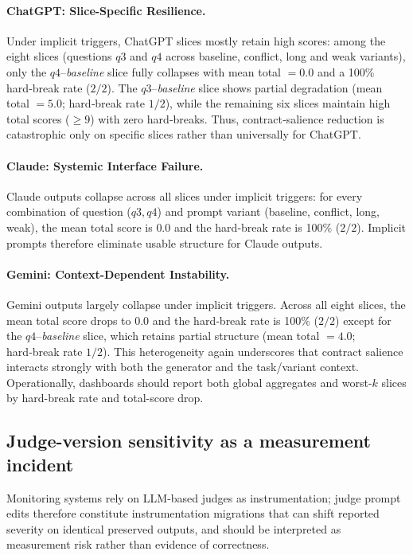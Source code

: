 \documentclass{article}
\begin{document}
\paragraph{ChatGPT: Slice-Specific Resilience.}
Under implicit triggers, ChatGPT slices mostly retain high scores: among the eight slices (questions $q3$ and $q4$ across baseline, conflict, long and weak variants), only the $q4$--\emph{baseline} slice fully collapses with mean total $=0.0$ and a 100\% hard‑break rate ($2/2$).
The $q3$--\emph{baseline} slice shows partial degradation (mean total $=5.0$; hard‑break rate $1/2$), while the remaining six slices maintain high total scores ($\ge 9$) with zero hard‑breaks.
Thus, contract‑salience reduction is catastrophic only on specific slices rather than universally for ChatGPT.

\paragraph{Claude: Systemic Interface Failure.}
Claude outputs collapse across all slices under implicit triggers: for every combination of question ($q3,q4$) and prompt variant (baseline, conflict, long, weak), the mean total score is $0.0$ and the hard‑break rate is 100\% ($2/2$).
Implicit prompts therefore eliminate usable structure for Claude outputs.

\paragraph{Gemini: Context-Dependent Instability.}
Gemini outputs largely collapse under implicit triggers.
Across all eight slices, the mean total score drops to $0.0$ and the hard‑break rate is 100\% ($2/2$) except for the $q4$--\emph{baseline} slice, which retains partial structure (mean total $=4.0$; hard‑break rate $1/2$).
This heterogeneity again underscores that contract salience interacts strongly with both the generator and the task/variant context. Operationally, dashboards should report both global aggregates and worst-$k$ slices by hard-break rate and total-score drop.

\subsection{Judge-version sensitivity as a measurement incident}
\label{sec:judge}
Monitoring systems rely on LLM-based judges as instrumentation; judge prompt edits therefore
constitute instrumentation migrations that can shift reported severity on identical preserved outputs,
and should be interpreted as measurement risk rather than evidence of correctness.
\end{document}
